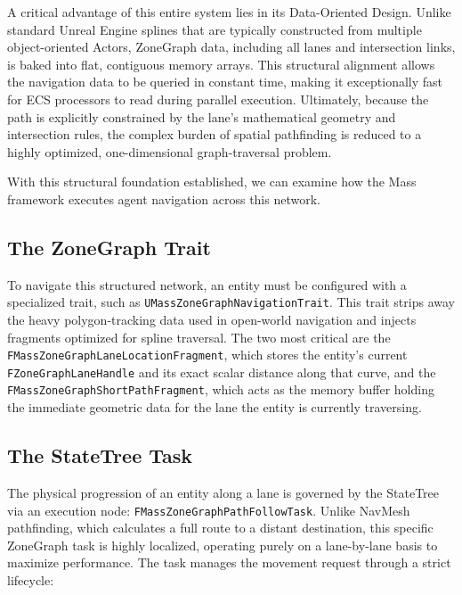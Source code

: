 A critical advantage of this entire system lies in its Data-Oriented Design. Unlike standard Unreal Engine splines that are typically constructed from multiple object-oriented Actors, ZoneGraph data, including all lanes and intersection links, is baked into flat, contiguous memory arrays. This structural alignment allows the navigation data to be queried in constant time, making it exceptionally fast for ECS processors to read during parallel execution. Ultimately, because the path is explicitly constrained by the lane's mathematical geometry and intersection rules, the complex burden of spatial pathfinding is reduced to a highly optimized, one-dimensional graph-traversal problem.

With this structural foundation established, we can examine how the Mass framework executes agent navigation across this network.

\subsection{The ZoneGraph Trait}

To navigate this structured network, an entity must be configured with a specialized trait, such as \texttt{UMassZoneGraphNavigationTrait}. This trait strips away the heavy polygon-tracking data used in open-world navigation and injects fragments optimized for spline traversal. The two most critical are the \newline\texttt{FMassZoneGraphLaneLocationFragment}, which stores the entity's current \newline\texttt{FZoneGraphLaneHandle} and its exact scalar distance along that curve, and the \texttt{FMassZoneGraphShortPathFragment}, which acts as the memory buffer holding the immediate geometric data for the lane the entity is currently traversing.

\subsection{The StateTree Task}

The physical progression of an entity along a lane is governed by the StateTree via an execution node: \texttt{FMassZoneGraphPathFollowTask}. Unlike NavMesh pathfinding, which calculates a full route to a distant destination, this specific ZoneGraph task is highly localized, operating purely on a lane-by-lane basis to maximize performance. The task manages the movement request through a strict lifecycle:

